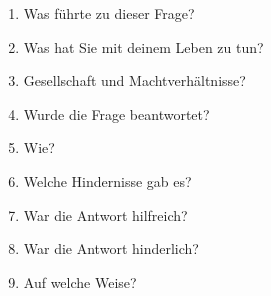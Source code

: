 \begin{enumerate}
    \item Was f\"uhrte zu dieser Frage?
    \item Was hat Sie mit deinem Leben zu tun?
    \item Gesellschaft und Machtverh\"altnisse?
    \item Wurde die Frage beantwortet?
    \item Wie?
    \item Welche Hindernisse gab es?
    \item War die Antwort hilfreich?
    \item War die Antwort hinderlich?
    \item Auf welche Weise?
\end{enumerate}


